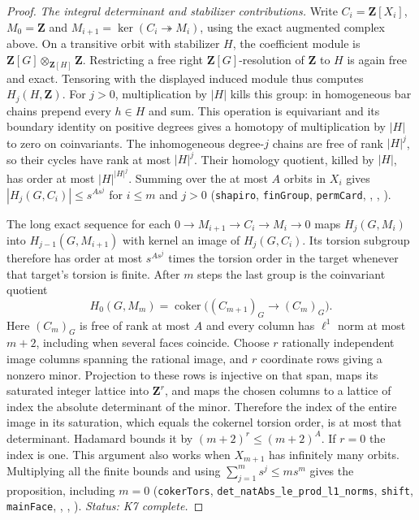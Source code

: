 \begin{proof}
\emph{The integral determinant and stabilizer contributions.}
Write $C_i=\mathbf Z[X_i]$, $M_0=\mathbf Z$ and
$M_{i+1}=\ker(C_i\twoheadrightarrow M_i)$, using the exact
augmented complex above. On a transitive orbit with stabilizer $H$,
the coefficient module is $\mathbf Z[G]\otimes_{\mathbf Z[H]}\mathbf Z$.
Restricting a free right $\mathbf Z[G]$-resolution of $\mathbf Z$
to $H$ is again free and exact. Tensoring with the displayed induced
module thus computes $H_j(H,\mathbf Z)$. For $j>0$, multiplication
by $|H|$ kills this group: in homogeneous bar chains prepend every
$h\in H$ and sum. This operation is equivariant and its boundary
identity on positive degrees gives a homotopy of multiplication by
$|H|$ to zero on coinvariants. The inhomogeneous degree-$j$ chains
are free of rank $|H|^j$, so their cycles have rank at most $|H|^j$.
Their homology quotient, killed by $|H|$, has order at most
$|H|^{|H|^j}$. Summing over the at most $A$ orbits in $X_i$ gives
$|H_j(G,C_i)|\le s^{A s^j}$ for $i\le m$ and $j>0$
(\nolinkurl{shapiro}, \nolinkurl{finGroup}, \nolinkurl{permCard},
,
,
).

The long exact sequence for each $0\to M_{i+1}\to C_i\to M_i\to0$
maps $H_j(G,M_i)$ into $H_{j-1}(G,M_{i+1})$ with kernel an image
of $H_j(G,C_i)$. Its torsion subgroup therefore has order at most
$s^{A s^j}$ times the torsion order in the target whenever that
target's torsion is finite. After $m$ steps the last group is the
coinvariant quotient
\[
 H_0(G,M_m)=\operatorname{coker}\big((C_{m+1})_G\longrightarrow(C_m)_G\big).
\]
Here $(C_m)_G$ is free of rank at most $A$ and every column has
$\ell^1$ norm at most $m+2$, including when several faces coincide.
Choose $r$ rationally independent image columns spanning the
rational image, and $r$ coordinate rows giving a nonzero minor.
Projection to these rows is injective on that span, maps its saturated
integer lattice into $\mathbf Z^r$, and maps the chosen columns to
a lattice of index the absolute determinant of the minor. Therefore
the index of the entire image in its saturation, which equals the
cokernel torsion order, is at most that determinant. Hadamard bounds
it by $(m+2)^r\le(m+2)^A$. If $r=0$ the index is one.
This argument also works when $X_{m+1}$ has infinitely many orbits.
Multiplying all the finite bounds and using
$\sum_{j=1}^m s^j\le m s^m$ gives the proposition, including $m=0$
(\nolinkurl{cokerTors}, \nolinkurl{det_natAbs_le_prod_l1_norms},
\nolinkurl{shift}, \nolinkurl{mainFace},
,
,
).
\emph{Status: K7 complete.}
\end{proof}

